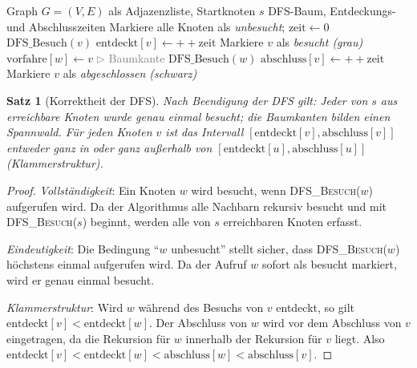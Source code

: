 ﻿\documentclass[a4paper,12pt,openany,oneside]{book}
\renewcommand{\algorithmiccomment}[1]{\hfill\textcolor{gray}{$\triangleright$ #1}}
\theoremstyle{definition}
\theoremstyle{plain}
\newtheorem{satz}{Satz}[chapter]
\theoremstyle{remark}
\begin{document}
\begin{algorithm}[H]
  \caption{Tiefensuche (DFS)}
  \label{alg:dfs}
  \begin{algorithmic}[1]
    \Require Graph $G=(V,E)$ als Adjazenzliste, Startknoten $s$
    \Ensure DFS-Baum, Entdeckungs- und Abschlusszeiten
    \State Markiere alle Knoten als \emph{unbesucht};
           $\mathrm{zeit} \gets 0$
        \State $\mathrm{DFS\_Besuch}(v)$
      \EndIf
    \EndFor
      \State $\mathrm{entdeckt}[v] \gets \mathrm{++zeit}$
      \State Markiere $v$ als \emph{besucht (grau)}
          \State $\mathrm{vorfahre}[w] \gets v$
          \algorithmiccomment{Baumkante}
          \State $\mathrm{DFS\_Besuch}(w)$
        \EndIf
      \EndFor
      \State $\mathrm{abschluss}[v] \gets \mathrm{++zeit}$
      \State Markiere $v$ als \emph{abgeschlossen (schwarz)}
    \EndProcedure
  \end{algorithmic}
\end{algorithm}

\begin{satz}[Korrektheit der DFS]
  Nach Beendigung der DFS gilt: Jeder von $s$ aus erreichbare Knoten
  wurde genau einmal besucht; die Baumkanten bilden einen Spannwald.
  F\"ur jeden Knoten $v$ ist das Intervall
  $[\mathrm{entdeckt}[v], \mathrm{abschluss}[v]]$ entweder ganz in oder
  ganz au\ss{}erhalb von $[\mathrm{entdeckt}[u], \mathrm{abschluss}[u]]$
  (Klammerstruktur).
\end{satz}

\begin{proof}
  \emph{Vollst\"andigkeit}: Ein Knoten $w$ wird besucht, wenn
  \textsc{DFS\_Besuch}($w$) aufgerufen wird. Da der Algorithmus alle
  Nachbarn rekursiv besucht und mit \textsc{DFS\_Besuch}($s$) beginnt,
  werden alle von $s$ erreichbaren Knoten erfasst.

  \emph{Eindeutigkeit}: Die Bedingung ``$w$ unbesucht'' stellt sicher,
  dass \textsc{DFS\_Besuch}($w$) h\"ochstens einmal aufgerufen wird.
  Da der Aufruf $w$ sofort als besucht markiert, wird er genau einmal
  besucht.

  \emph{Klammerstruktur}: Wird $w$ w\"ahrend des Besuchs von $v$
  entdeckt, so gilt $\mathrm{entdeckt}[v] < \mathrm{entdeckt}[w]$.
  Der Abschluss von $w$ wird vor dem Abschluss von $v$ eingetragen,
  da die Rekursion f\"ur $w$ innerhalb der Rekursion f\"ur $v$ liegt.
  Also $\mathrm{entdeckt}[v] < \mathrm{entdeckt}[w] < \mathrm{abschluss}[w]
  < \mathrm{abschluss}[v]$.
\end{proof}
\end{document}
